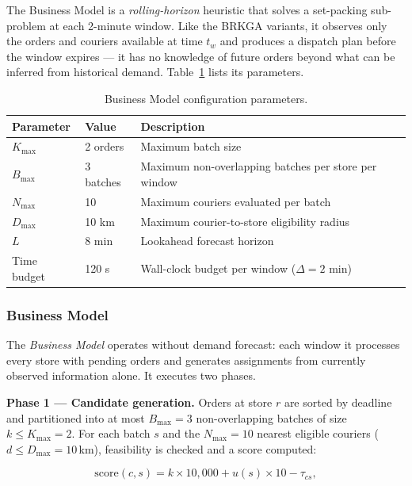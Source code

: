 The Business Model is a \emph{rolling-horizon} heuristic that solves a
set-packing sub-problem at each 2-minute window.
Like the BRKGA variants, it observes only the orders and couriers
available at time $t_w$ and produces a dispatch plan before the
window expires — it has no knowledge of future orders beyond
what can be inferred from historical demand.
Table~\ref{tab:maxcover_params} lists its parameters.

\begin{table}[ht]
\centering
\caption{Business Model configuration parameters.}
\label{tab:maxcover_params}
\small
\begin{tabular}{lll}
\toprule
\textbf{Parameter} & \textbf{Value} & \textbf{Description} \\
\midrule
$K_{\max}$          & 2 orders  & Maximum batch size \\
$B_{\max}$          & 3 batches & Maximum non-overlapping batches per store per window \\
$N_{\max}$          & 10        & Maximum couriers evaluated per batch \\
$D_{\max}$          & 10 km     & Maximum courier-to-store eligibility radius \\
$L$                 & 8 min     & Lookahead forecast horizon \\
Time budget         & 120 s     & Wall-clock budget per window ($\Delta = 2$ min) \\
\bottomrule
\end{tabular}
\end{table}

\subsubsection{Business Model}
\label{subsubsec:maxcover_base}

The \emph{Business Model} operates without demand forecast: each window it processes every store with pending orders and generates assignments from currently observed information alone.
It executes two phases.

\textbf{Phase 1 — Candidate generation.}
Orders at store $r$ are sorted by deadline and partitioned into at most $B_{\max}=3$ non-overlapping batches of size $k \leq K_{\max}=2$.
For each batch $s$ and the $N_{\max}=10$ nearest eligible couriers ($d \leq D_{\max}=10$\,km), feasibility is checked and a score computed:

\begin{equation}\label{eq:maxcover_score}
    \text{score}(c, s) = k \times 10{,}000 + u(s) \times 10 - \tau_{cs},
\end{equation}

